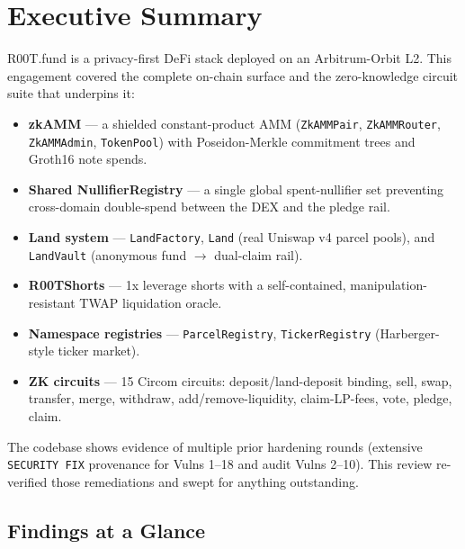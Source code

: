 \documentclass[11pt,a4paper]{article}
\begin{document}
\section{Executive Summary}

R00T.fund is a privacy-first DeFi stack deployed on an Arbitrum-Orbit L2. This
engagement covered the complete on-chain surface and the zero-knowledge circuit
suite that underpins it:

\begin{itemize}[leftmargin=1.4em,itemsep=2pt]
  \item \textbf{zkAMM} — a shielded constant-product AMM (\texttt{ZkAMMPair},
        \texttt{ZkAMMRouter}, \texttt{ZkAMMAdmin}, \texttt{TokenPool}) with
        Poseidon-Merkle commitment trees and Groth16 note spends.
  \item \textbf{Shared NullifierRegistry} — a single global spent-nullifier set
        preventing cross-domain double-spend between the DEX and the pledge rail.
  \item \textbf{Land system} — \texttt{LandFactory}, \texttt{Land} (real Uniswap
        v4 parcel pools), and \texttt{LandVault} (anonymous fund $\rightarrow$
        dual-claim rail).
  \item \textbf{R00TShorts} — 1x leverage shorts with a self-contained,
        manipulation-resistant TWAP liquidation oracle.
  \item \textbf{Namespace registries} — \texttt{ParcelRegistry},
        \texttt{TickerRegistry} (Harberger-style ticker market).
  \item \textbf{ZK circuits} — 15 Circom circuits: deposit/land-deposit binding,
        sell, swap, transfer, merge, withdraw, add/remove-liquidity,
        claim-LP-fees, vote, pledge, claim.
\end{itemize}

The codebase shows evidence of multiple prior hardening rounds (extensive
\texttt{SECURITY FIX} provenance for Vulns 1--18 and audit Vulns 2--10). This
review re-verified those remediations and swept for anything outstanding.

\subsection{Findings at a Glance}
\end{document}
